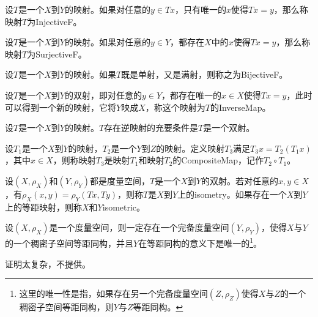 \begin{definition}
	设$T$是一个$X$到$Y$的映射。如果对任意的$y\in Tx$，只有唯一的$x$使得$Tx=y$，那么称映射$T$为\gls{InjectiveF}。
\end{definition}
\begin{definition}
	设$T$是一个$X$到$Y$的映射。如果对任意的$y\in Y$，都存在$X$中的$x$使得$Tx=y$，那么称映射$T$为\gls{SurjectiveF}。
\end{definition}
\begin{definition}
	设$T$是一个$X$到$Y$的映射。如果$T$既是单射，又是满射，则称之为\gls{BijectiveF}。
\end{definition}
\begin{definition}
	设$T$是一个$X$到$Y$的双射，即对任意的$y\in Y$，都存在唯一的$x\in X$使得$Tx=y$，此时可以得到一个新的映射，它将$Y$映成$X$，称这个映射为$T$的\gls{InverseMap}。
\end{definition}
\begin{theorem}
	设$T$是一个$X$到$Y$的映射。$T$存在逆映射的充要条件是$T$是一个双射。
\end{theorem}
\begin{definition}
	设$T_1$是一个$X$到$Y$的映射，$T_2$是一个$Y$到$Z$的映射。定义映射$T_3$满足$T_3x=T_2(T_1x)$，其中$x\in X$，则称映射$T_3$是映射$T_1$和映射$T_2$的\gls{CompositeMap}，记作$T_2\circ T_1$。
\end{definition}
\begin{definition}
	设$(X,\rho_X)$和$(Y,\rho_Y)$都是度量空间，$T$是一个$X$到$Y$的双射。若对任意的$x,y\in X$，有$\rho_X(x,y)=\rho_Y(Tx,Ty)$，则称$T$是$X$到$Y$上的\gls{isometry}。如果存在一个$X$到$Y$上的等距映射，则称$X$和$Y$\gls{isometric}。
\end{definition}
\begin{theorem}
	设$(X,\rho_X)$是一个度量空间，则一定存在一个完备度量空间$(Y,\rho_Y)$，使得$X$与$Y$的一个稠密子空间等距同构，并且$Y$在等距同构的意义下是唯一的\footnote{这里的唯一性是指，如果存在另一个完备度量空间$(Z,\rho_Z)$使得$X$与$Z$的一个稠密子空间等距同构，则$Y$与$Z$等距同构。}。
\end{theorem}
证明太复杂，不提供。
